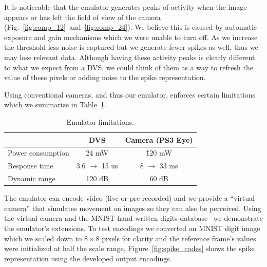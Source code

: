 \documentclass[conference]{IEEEtran}
\begin{document}
It is noticeable that the emulator generates peaks of activity when the image appears or has left the field of view of the camera (Fig.~\ref{fig:comp_12}~and~\ref{fig:comp_24}). We believe this is caused by automatic exposure and gain mechanisms which we were unable to turn off. As we increase the threshold less noise is captured but we generate fewer spikes as well, thus we may lose relevant data. Although having these activity peaks is clearly different to what we expect from a DVS, we could think of them as a way to refresh the value of these pixels or adding noise to the spike representation.

Using conventional cameras, and thus our emulator, enforces certain limitations which we summarize in Table~\ref{tb:constraints}.

\begin{table}[hbt]
  \centering
  \caption{Emulator limitations.}
  \label{tb:constraints}
  \begin{tabular}{l c c}
    & DVS & Camera (PS3 Eye) \\ 
    \hline
    \rule{0pt}{0.4cm}Power consumption & 24 mW & \~120 mW\\
    Response time & 3.6 $\rightarrow$ 15 us & 8 $\rightarrow$ 33 ms \\
    Dynamic range & 120 dB & 60 dB\\
  \end{tabular}

\end{table}


The emulator can encode video (live or pre-recorded) and we provide a ``virtual camera'' that simulates movement on images so they can also be perceived. Using the virtual camera and the MNIST hand-written digits database~\cite{mnist,mnist:web} we demonstrate the emulator's extensions. To test encodings we converted an MNIST  digit image which we scaled down to $8\times8$ pixels for clarity and the reference frame's values were initialized at half the scale range, Figure~\ref{fig:spike_codes} shows the spike representation using the developed output encodings.
\end{document}
